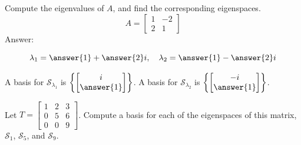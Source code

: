 \documentclass{ximera}
\begin{document}
\begin{problem}\label{prob:eigenspace4}Compute the eigenvalues of $A$, and find the corresponding eigenspaces.
$$A=\begin{bmatrix}1&-2\\2&1\end{bmatrix}$$
Answer:

$$\lambda_1=\answer{1}+\answer{2}i,\quad\lambda_2=\answer{1}-\answer{2}i$$

A basis for $\mathcal{S}_{\lambda_1}$ is $\left\{\begin{bmatrix}i\\\answer{1}\end{bmatrix}\right\}$.  A basis for $\mathcal{S}_{\lambda_2}$ is $\left\{\begin{bmatrix}-i\\\answer{1}\end{bmatrix}\right\}$.
\end{problem}


\begin{problem}\label{prob:3x3tri_ev}
Let $T=\begin{bmatrix} 1 & 2 & 3\\ 0 & 5 & 6\\ 0 & 0 & 9\end{bmatrix}$.  Compute a basis for each of the eigenspaces of this matrix, $\mathcal{S}_1$, $\mathcal{S}_5$, and $\mathcal{S}_9$.
\end{problem}
\end{document}
